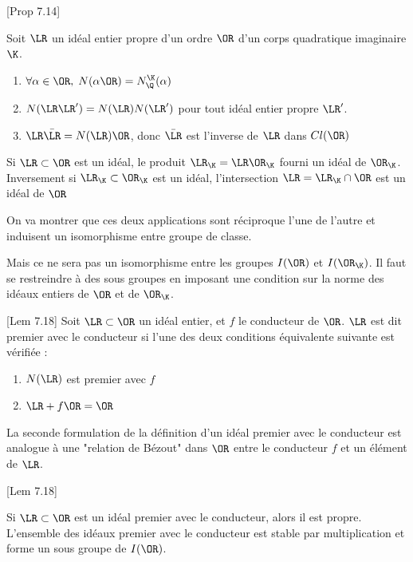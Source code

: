 \begin{Prop}\cite{Cox}[Prop 7.14]
	
	Soit $\LR$ un idéal entier propre d'un ordre $\OR$ d'un corps quadratique imaginaire $\K$. 
	\begin{enumerate}
		\item $\forall\alpha\in\OR,\; N(\alpha\OR) = N_{\Q}^{\K}(\alpha)$
		\item $N(\LR\LR') = N(\LR)N(\LR')$ pour tout idéal entier propre $\LR'$.
		\item $\LR\bar{\LR} = N(\LR)\OR$, donc $\bar{\LR}$ est l'inverse de $\LR$ dans $Cl(\OR)$
	\end{enumerate}
\end{Prop}

Si $\LR\subset\OR$ est un idéal, le produit $\LR_{\K} = \LR\OR_{\K}$ fourni un idéal de $\OR_{\K}$. Inversement si $\LR_{\K}\subset\OR_{\K}$ est un idéal, l'intersection $\LR = \LR_{\K}\cap\OR$ est un idéal de $\OR$

On va montrer que ces deux applications sont réciproque l'une de l'autre et induisent un isomorphisme entre groupe de classe. 

Mais ce ne sera pas un isomorphisme entre les groupes $I(\OR)$ et $I(\OR_{\K})$. Il faut se restreindre à des sous groupes en imposant une condition sur la norme des idéaux entiers de $\OR$ et de $\OR_{\K}$.

\begin{Def}\cite{Cox}[Lem 7.18]
	Soit $\LR\subset\OR$ un idéal entier, et $f$ le conducteur de $\OR$. $\LR$ est dit premier avec le conducteur si l'une des deux conditions équivalente suivante est vérifiée :
	\begin{enumerate}
		\item $N(\LR)$ est premier avec $f$
		\item $\LR + f\OR = \OR$
	\end{enumerate}
\end{Def}

\begin{Rem}
	La seconde formulation de la définition d'un idéal premier avec le conducteur est analogue à une "relation de Bézout" dans $\OR$ entre le conducteur $f$ et un élément de $\LR$.
\end{Rem}

\begin{Prop}\cite{Cox}[Lem 7.18]
	
	Si $\LR\subset\OR$ est un idéal premier avec le conducteur, alors il est propre. L'ensemble des idéaux premier avec le conducteur est stable par multiplication et forme un sous groupe de $I(\OR)$.  
\end{Prop}

